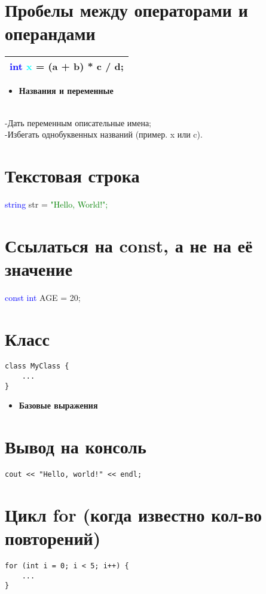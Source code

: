 \documentclass[12pt, letterpaper]{article}
\begin{document}
\section{Пробелы между операторами и операндами}
\begin{flushleft}
\begin{tabular}{ |l| } 
 \hline
\textcolor{blue}{int} \textcolor{cyan}{x }= (a + b) * c / d; \\
 \hline
\end{tabular}
\end{flushleft}
\begin{itemize}
\vspace*{10mm}
\hline
    \item \Large\textbf{Названия и переменные}
\end{itemize}
\\-Дать переменным описательные имена;
\\-Избегать однобуквенных названий (пример. x или c).
\setcounter{section}{0}
\section{Текстовая строка}
\textcolor{blue}{string} str = \textcolor{green}{"Hello, World!";} \\
\section{Ссылаться на const, а не на её значение}
    \textcolor{blue}{const int} AGE = 20;
\section{Класс}
\begin{verbatim}
class MyClass {
    ...
}
\end{verbatim}

    \begin{itemize}
\vspace*{10mm}
\hline
    \item \Large\textbf{Базовые выражения}
\end{itemize}
\setcounter{section}{0}
\section{Вывод на консоль}
\begin{verbatim}
cout << "Hello, world!" << endl;
\end{verbatim}
\section{Цикл for (когда известно кол-во повторений)}
\begin{verbatim}
for (int i = 0; i < 5; i++) {
    ...
}
\end{verbatim}
\end{document}
